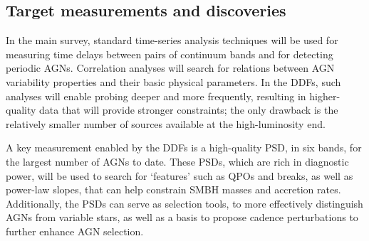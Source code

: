 

\subsection{Target measurements and discoveries}
\label{sec:\secname:targets}


In the main survey, standard time-series analysis techniques will be used for
measuring time delays between pairs of continuum bands and for detecting
periodic AGNs. Correlation analyses will search for relations between AGN
variability properties and their basic physical parameters. In the DDFs, such
analyses will enable probing deeper and more frequently, resulting in
higher-quality data that will provide stronger constraints; the only drawback is
the relatively smaller number of sources available at the high-luminosity end.

A key measurement enabled by the DDFs is a high-quality PSD, in six bands,
for the largest number of AGNs to date. These PSDs, which are rich
in diagnostic power, will be used to search for `features' such as QPOs
and breaks, as well as power-law slopes, that can help constrain SMBH masses
and accretion rates. Additionally, the PSDs can serve as selection
tools, to more effectively distinguish AGNs from variable stars, as
well as a basis to propose cadence perturbations to further enhance
AGN selection.

